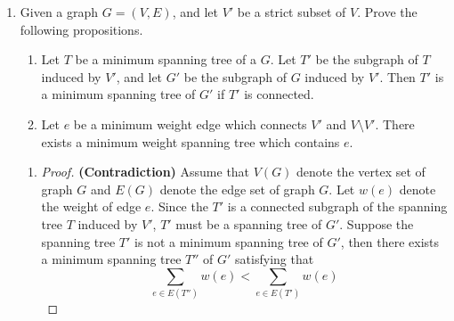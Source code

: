 \documentclass[12pt,a4paper]{article}
\theoremstyle{definition}
\begin{document}
\begin{enumerate}
\begin{enumerate}
\begin{proof}
        Therefore, with the help of Equation \eqref{eq2-3-2}, we can make some derivations as follows about the time cost of $n$ push operation $T(n)$.
        \begin{displaymath}
        \begin{aligned}
        \sum_{i=1}^n c_i &= \sum_{i=1}^n \hat{c_i} - \Phi(S_n) + \Phi(S_0)\\
                         &\leq \sum_{i=1}^n \hat{c_i}\\
                         &= n \cdot (M+1)\\
                         &= n \cdot \left(\left\lceil \log_3{(2n+1)} \right\rceil + 1\right) \\
                         &= O(n \log{n})
        \end{aligned}
        \end{displaymath}

        Hence, the amortized cost of one push operation is $O(\log{n})$

    \end{proof}
    \end{enumerate}	
    \clearpage


	\item Given a graph $G = (V, E)$, and let $V'$ be a strict subset of $V$. Prove the following propositions.
	
	\begin{enumerate}
		\item Let $T$ be a minimum spanning tree of a $G$. Let $T'$ be the subgraph of $T$ induced by $V'$, and let $G'$ be the subgraph of $G$ induced by $V'$. Then $T'$ is a minimum spanning tree of $G'$ if $T'$ is connected.
		\item Let $e$ be a minimum weight edge which connects $V'$ and $V \setminus V'$. There exists a minimum weight spanning tree which contains $e$.
	\end{enumerate}
    \begin{enumerate}
    \item
    \begin{proof}
    \textbf{(Contradiction)}  Assume that $V(G)$ denote the vertex set of graph $G$ and $E(G)$ denote the edge set of graph $G$. Let $w(e)$ denote the weight of edge $e$. Since the $T'$ is a connected subgraph of the spanning tree $T$ induced by $V'$, $T'$ must be a spanning tree of $G'$. Suppose the spanning tree $T'$ is not a minimum spanning tree of $G'$, then there exists a minimum spanning tree $T''$ of $G'$ satisfying that
    \begin{equation}
    \sum_{e \in E(T'')} w(e) < \sum_{e \in E(T')} w(e)
    \label{eq3-1}
    \end{equation}


\end{proof}
\end{enumerate}
\end{enumerate}
\end{document}
